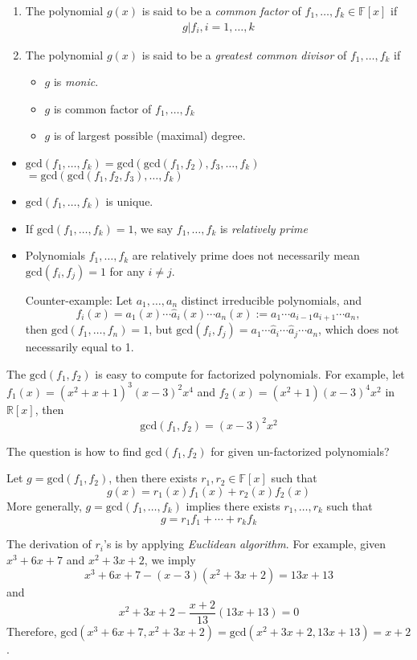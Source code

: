 \begin{definition}
\begin{enumerate}
\item
The polynomial $g(x)$ is said to be a \emph{common factor} of $f_1,\dots,f_k\in\mathbb{F}[x]$ if
\[
\begin{array}{ll}
g|f_i,
i=1,\dots,k
\end{array}
\]
\item
The polynomial $g(x)$ is said to be a \emph{greatest common divisor} of $f_1,\dots,f_k$ if
\begin{itemize}
\item
$g$ is \emph{monic}.
\item
$g$ is common factor of $f_1,\dots,f_k$
\item
$g$ is of largest possible (maximal) degree.
\end{itemize} 
\end{enumerate}
\end{definition}

\begin{remark}
\begin{itemize}
\item
$\text{gcd}(f_1,\dots,f_k) = \text{gcd}(\text{gcd}(f_1,f_2),f_3,\dots,f_k)$
$=\text{gcd}(\text{gcd}(f_1,f_2,f_3),\dots,f_k)$
\item
$\text{gcd}(f_1,\dots,f_k)$ is unique.
\item
If $\text{gcd}(f_1,\dots,f_k)=1$, we say $f_1,\dots,f_k$ is \emph{relatively prime}
\item
Polynomials $f_1,\dots,f_k$ are relatively prime does not necessarily mean $\text{gcd}(f_i,f_j)=1$ for any $i\ne j$.

Counter-example:
Let $a_1,\dots,a_n$ distinct irreducible polynomials, and
\[
f_i(x) = a_1(x)\cdots \hat{a}_i(x)\cdots a_n(x):=a_1\cdots a_{i-1}a_{i+1}\cdots a_n,
\]
then $\text{gcd}(f_1,\dots,f_n)=1$, but $\text{gcd}(f_i,f_j) = a_1\cdots\hat{a}_i\cdots\hat{a}_j\cdots a_n$, which does not necessarily equal to 1.
\end{itemize}
\end{remark}
\begin{example}
The $\text{gcd}(f_1,f_2)$ is easy to compute for factorized polynomials. For example, let $f_1(x) = (x^2+x+1)^3(x-3)^2x^4$ and
$f_2(x)=(x^2+1)(x-3)^4x^2$ in $\mathbb{R}[x]$, then
\[
\text{gcd}(f_1,f_2) = (x-3)^2x^2
\]
\end{example}
The question is how to find $\text{gcd}(f_1,f_2)$ for given un-factorized polynomials? 
\begin{theorem}[Rezout]
Let $g = \text{gcd}(f_1,f_2)$, then there exists $r_1,r_2\in\mathbb{F}[x]$ such that
\[
g(x)  =r_1(x)f_1(x)+r_2(x)f_2(x)
\]
More generally, $g=\text{gcd}(f_1,\dots,f_k)$ implies there exists $r_1,\dots,r_k$ such that 
\[
g = r_1f_1+\cdots+r_kf_k
\]
\end{theorem}
The derivation of $r_i$'s is by applying \emph{Euclidean algorithm}. For example, given $x^3+6x+7$ and $x^2+3x+2$, we imply 
\[
x^3+6x+7 - (x-3)(x^2+3x+2) = 13x+13
\]
and
\[
x^2+3x+2 - \frac{x+2}{13}(13x+13)=0
\]
Therefore, $\text{gcd}(x^3+6x+7,x^2+3x+2) = \text{gcd}(x^2+3x+2,13x+13)=x+2$.

